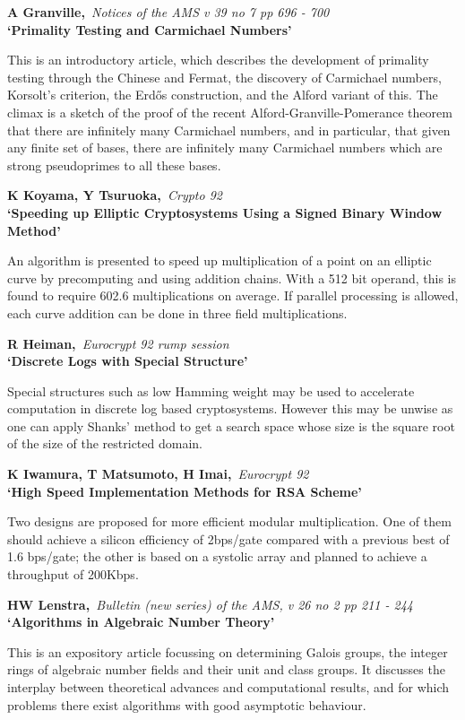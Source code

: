 {\bf \noindent A Granville,}{\em ~Notices of the AMS v 39 no 7 pp 696 - 700\\}
{\bf `Primality Testing and Carmichael Numbers'}

This is an introductory article, which describes the development of primality 
testing through the Chinese and Fermat, the discovery of Carmichael numbers, 
Korsolt's criterion, the Erd\H{o}s construction, and the Alford variant of 
this. The climax is a sketch of the proof of the recent 
Alford-Granville-Pomerance theorem that there are infinitely many Carmichael
numbers, and in particular, that given any finite set of bases, there are
infinitely many Carmichael numbers which are strong pseudoprimes to all these 
bases.

{\bf \noindent K Koyama, Y Tsuruoka,}{\em ~Crypto 92\\}
{\bf `Speeding up Elliptic Cryptosystems Using a Signed Binary Window Method'}

An algorithm is presented to speed up multiplication of a point on an
elliptic curve by precomputing and using addition chains. With a 512 bit
operand, this is found to require 602.6 multiplications on average. If 
parallel processing is allowed, each curve addition can be done in
three field multiplications.

{\bf \noindent R Heiman,}{\em ~Eurocrypt 92 rump session\\}
{\bf `Discrete Logs with Special Structure'}

Special structures such as low Hamming weight may be used to accelerate
computation in discrete log based cryptosystems. However this may be unwise as
one can apply Shanks' method to get a search space whose size is the square 
root of the size of the restricted domain.

{\bf \noindent K Iwamura, T Matsumoto, H Imai,}{\em ~Eurocrypt 92\\}
{\bf `High Speed Implementation Methods for RSA Scheme'}

Two designs are proposed for more efficient modular multiplication. One
of them should achieve a silicon efficiency of 2bps/gate compared with a 
previous best of 1.6 bps/gate; the other is based on a systolic array and 
planned to achieve a throughput of 200Kbps.

{\bf \noindent HW Lenstra,}{\em ~Bulletin (new series) of the AMS, v 26
no 2 pp 211 - 244\\}
{\bf `Algorithms in Algebraic Number Theory'}

This is an expository article focussing on determining Galois groups, the
integer rings of algebraic number fields and their unit and class groups.
It discusses the interplay between theoretical advances and computational
results, and for which problems there exist algorithms with good
asymptotic behaviour.

